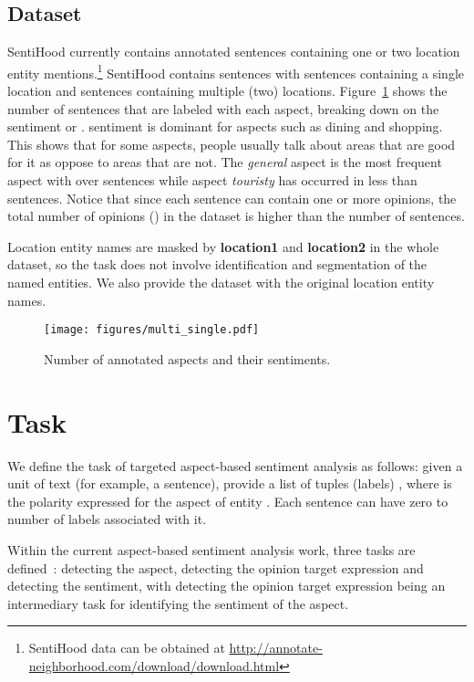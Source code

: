 \documentclass[11pt]{article}
\begin{document}
        \subsection{Dataset}
        SentiHood currently contains annotated sentences containing one or two location entity mentions.\footnote{SentiHood data can be obtained at \url{http://annotate-neighborhood.com/download/download.html}} SentiHood contains  sentences with  sentences containing a single location and  sentences containing multiple (two) locations. Figure~\ref{fig:sentihood_stat} shows the number of sentences that are labeled with each aspect, breaking down on the sentiment  or .  sentiment is dominant for aspects such as dining and shopping. This shows that for some aspects, people usually talk about areas that are good for it as oppose to areas that are not. The \textit{general} aspect is the most frequent aspect with over  sentences while aspect \textit{touristy} has occurred in less than  sentences. Notice that since each sentence can contain one or more opinions, the total number of opinions () in the dataset is higher than the number of sentences.
        
        Location entity names are masked by \textbf{location1} and \textbf{location2} in the whole dataset, so the task does not involve identification and segmentation of the named entities. We also provide the dataset with the original location entity names. 
        \begin{figure}[ht]
          \centering
              \texttt{[image: figures/multi\_single.pdf]}
          \caption{Number of annotated aspects and their sentiments.}
          \label{fig:sentihood_stat}
        \end{figure}
\section{Task}
We define the task of targeted aspect-based sentiment analysis as follows: given a unit of text  (for example, a sentence), provide a list of tuples (labels) , where  is the polarity expressed for the aspect  of entity . Each sentence can have zero to  number of labels associated with it.
        
        Within the current aspect-based sentiment analysis work, three tasks are defined~\cite{brychcin2014uwb}: detecting the aspect, detecting the opinion target expression and detecting the sentiment, with detecting the opinion target expression being an intermediary task for identifying the sentiment of the aspect.
        
\end{document}
